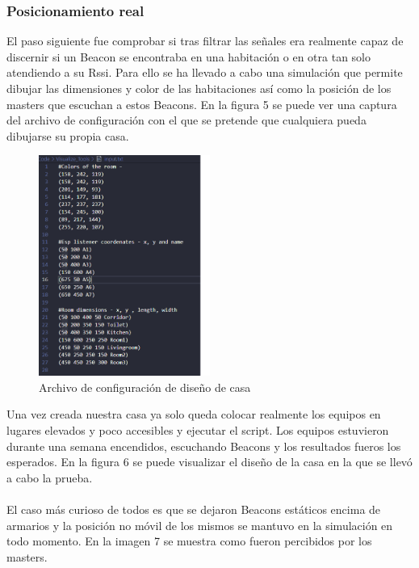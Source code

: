 \documentclass[paper=a4, fontsize=11pt,twoside]{scrartcl}
\begin{document}
        \subsubsection{Posicionamiento real}
            El paso siguiente fue comprobar si tras filtrar las señales era realmente capaz de discernir si un Beacon se encontraba en una habitación
            o en otra tan solo atendiendo a su Rssi. Para ello se ha llevado a cabo una simulación que permite dibujar las dimensiones y color de las 
            habitaciones así como la posición de los masters que escuchan a estos Beacons. En la figura 5 se puede ver una captura del archivo de configuración 
            con el que se pretende que cualquiera pueda dibujarse su propia casa.
            \begin{center}
                \begin{figure}[]
                    \centering
                    \includegraphics[width=0.5\textwidth]{../../Memmory/images/config_file_house.PNG}
                    \caption{Archivo de configuración de diseño de casa}
                    \label{fig:mesh16}
                \end{figure}
            \end{center}
            Una vez creada nuestra casa ya solo queda colocar realmente los equipos en lugares elevados y poco accesibles y ejecutar el script.
            Los equipos estuvieron durante una semana encendidos, escuchando Beacons y los resultados fueros los esperados. En la figura 6 se puede 
            visualizar el diseño de la casa en la que se llevó a cabo la prueba.
            \paragraph{}
            El caso más curioso de todos es que se dejaron Beacons estáticos encima de armarios y la posición no móvil de los mismos 
            se mantuvo en la simulación en todo momento. En la imagen 7 se muestra como fueron percibidos por los masters.
\end{document}
